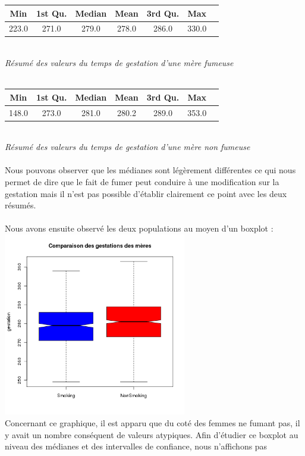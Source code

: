 \documentclass[a4paper, 10pt]{article}
\begin{document}
\begin{tabular}{|c|c|c|c|c|c|c|}
\hline
Min & 1st Qu. & Median & Mean & 3rd Qu. & Max\\
\hline
223.0 & 271.0 & 279.0 & 278.0 & 286.0 & 330.0\\
\hline
\end{tabular}\\
\textit{R\'esum\'e des valeurs du temps de gestation d'une m\`ere fumeuse}\\ \\
\begin{tabular}{|c|c|c|c|c|c|c|}
\hline
Min & 1st Qu. & Median & Mean & 3rd Qu. & Max\\
\hline
148.0 & 273.0 & 281.0 & 280.2 & 289.0 & 353.0\\
\hline
\end{tabular}\\
\textit{R\'esum\'e des valeurs du temps de gestation d'une m\`ere non fumeuse}\\ \\
Nous pouvons observer que les m\'edianes sont l\'eg\`erement diff\'erentes ce qui nous permet de dire que le fait de fumer peut conduire \`a
une modification sur la gestation mais il n'est pas possible d'établir clairement ce point avec les deux r\'esum\'es.\\ \\
Nous avons ensuite observ\'e les deux populations au moyen d'un boxplot :\\
\includegraphics[height = 8cm, width = 8cm]{plots/boxplot_gestation_smoke.png}\\
Concernant ce graphique, il est apparu que du cot\'e des femmes ne fumant pas, il y avait un nombre cons\'equent de valeurs atypiques.
Afin d'\'etudier ce boxplot au niveau des m\'edianes et des intervalles de confiance, nous n'affichons pas
\end{document}
